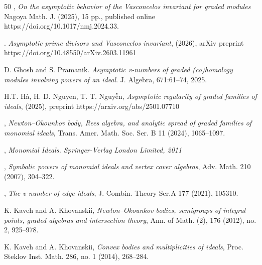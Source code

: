 \documentclass[11pt,reqno,a4paper]{amsart}
\theoremstyle{definition}
\begin{document}
\begin{thebibliography}{50}
, \textit{ On the asymptotic behavior of the Vasconcelos invariant for graded modules} Nagoya Math. J. (2025), 15 pp., published online
https://doi.org/10.1017/nmj.2024.33.



. \textit{Asymptotic prime divisors and  Vasconcelos invariant}, (2026), arXiv preprint https://doi.org/10.48550/arXiv.2603.11961


 {D. Ghosh and S. Pramanik}. \textit {Asymptotic v-numbers of graded (co)homology
modules involving powers of an ideal}. J. Algebra, 671:61–74, 2025.




 {H.T. H\`a, H. D. Nguyen, T. T. Nguy\~{\^e}n}, \textit {Asymptotic regularity of graded families of ideals},
(2025), preprint https://arxiv.org/abs/2501.07710










, \textit{ Newton–Okounkov body, Rees algebra, and analytic spread of graded families
of monomial ideals}, Trans. Amer. Math. Soc. Ser. B 11 (2024), 1065–1097.


, {\textit {Monomial Ideals. Springer-Verlag London Limited, 2011}}


 , {\textit {Symbolic powers of monomial ideals and vertex cover algebras}},
Adv. Math. 210 (2007), 304–322.

, {\textit {The v-number of edge ideals}}, J. Combin. Theory Ser.A 177 (2021),
105310.








 {K. Kaveh and A. Khovanskii}, \textit{ Newton–Okounkov bodies, semigroups of integral points, graded algebras
and intersection theory}, Ann. of Math. (2), 176 (2012), no. 2, 925–978.


 {K. Kaveh and A. Khovanskii},{\textit{ Convex bodies and multiplicities of ideals}}, Proc. Steklov Inst. Math. 286,
no. 1 (2014), 268–284.



\end{thebibliography}
\end{document}

